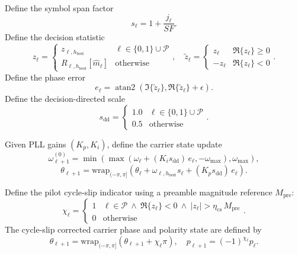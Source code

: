 \documentclass[11pt]{article}
\begin{document}
Define the symbol span factor
\[
  s_\ell = 1 + \frac{j_\ell}{\mathit{SF}}.
\]
Define the decision statistic
\[
  z_\ell=
  \begin{cases}
  z_{\ell,h_{\text{best}}} & \ell\in\{0,1\}\cup\mathcal{P}\\
  R_{\ell,h_{\text{best}}}[\hat m_\ell] & \text{otherwise}
  \end{cases},
\quad
  \tilde z_\ell=
  \begin{cases}
  z_\ell & \Re\{z_\ell\}\ge 0\\
  -z_\ell & \Re\{z_\ell\}<0
  \end{cases}.
\]
Define the phase error
\[
  e_\ell=\operatorname{atan2}(\Im\{\tilde z_\ell\},\Re\{\tilde z_\ell\}+\epsilon).
\]
Define the decision-directed scale
\[
  s_{\text{dd}}=
  \begin{cases}
  1.0 & \ell\in\{0,1\}\cup\mathcal{P}\\
  0.5 & \text{otherwise}
  \end{cases}.
\]

Given PLL gains $(K_p,K_i)$, define the carrier state update
\[
  \omega_{\ell+1}^{(0)}=\min\!\left(\max\!\left(\omega_\ell + (K_i s_{\text{dd}})\,e_\ell,-\omega_{\max}\right),\omega_{\max}\right),
\]
\[
  \theta_{\ell+1}=\mathrm{wrap}_{(-\pi,\pi]}\!\left(\theta_\ell + \omega_{\ell,h_{\text{best}}} s_\ell + (K_p s_{\text{dd}})\,e_\ell\right).
\]

Define the pilot cycle-slip indicator using a preamble magnitude reference $M_{\text{pre}}$:
\[
  \chi_\ell=
  \begin{cases}
  1 & \ell\in\mathcal{P}\ \wedge\ \Re\{z_\ell\}<0\ \wedge\ |z_\ell|>\eta_{\text{cs}}\,M_{\text{pre}}\\
  0 & \text{otherwise}
  \end{cases}.
\]
The cycle-slip corrected carrier phase and polarity state are defined by
\[
  \theta_{\ell+1}=\mathrm{wrap}_{(-\pi,\pi]}\!\left(\theta_{\ell+1}+\chi_\ell\pi\right),\quad
  p_{\ell+1}=(-1)^{\chi_\ell}p_\ell.
\]
\end{document}
